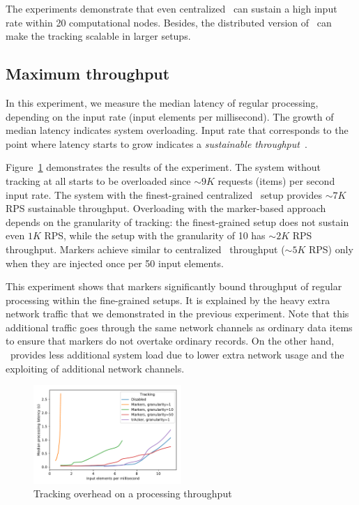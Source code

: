 The experiments demonstrate that even centralized \tracker\ can sustain a high input rate within 20 computational nodes. Besides, the distributed version of \tracker\ can make the tracking scalable in larger setups.

\subsection{Maximum throughput}
In this experiment, we measure the median latency of regular processing, depending on the input rate (input elements per millisecond). The growth of median latency indicates system overloading. Input rate that corresponds to the point where latency starts to grow indicates a {\em sustainable throughput}~\cite{karimov2018benchmarking}.

Figure~\ref{throughput_overhead} demonstrates the results of the experiment. The system without tracking at all starts to be overloaded since $\sim 9K$ requests (items) per second input rate. The system with the finest-grained centralized \tracker\ setup provides $\sim 7K$ RPS sustainable throughput. Overloading with the marker-based approach depends on the granularity of tracking: the finest-grained setup does not sustain even $1K$ RPS, while the setup with the granularity of 10 has $\sim 2K$ RPS throughput. Markers achieve similar to centralized \tracker\ throughput ($\sim 5K$ RPS) only when they are injected once per 50 input elements.

This experiment shows that markers significantly bound throughput of regular processing within the fine-grained setups. It is explained by the heavy extra network traffic that we demonstrated in the previous experiment. Note that this additional traffic goes through the same network channels as ordinary data items to ensure that markers do not overtake ordinary records. On the other hand, \tracker\ provides less additional system load due to lower extra network usage and the exploiting of additional network channels.

\begin{figure}[htbp]
  \centering
  \includegraphics[width=0.50\textwidth]{pics/throughput_overhead_50.pdf}
  \caption{Tracking overhead on a processing throughput}
  \label{throughput_overhead}
\end{figure}

